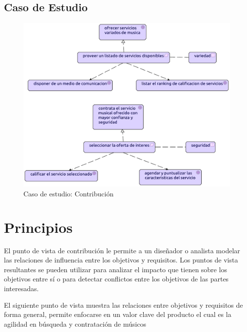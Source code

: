 \subsection{Caso de Estudio}
\begin{figure}[h!]
	\centering
	\includegraphics[width=\linewidth]{Arquitectura/Motivacion/imgs/Contribucion.pdf}
	\caption{Caso de estudio: Contribución}
	\label{fig:comportamiento}
\end{figure}

\newpage


\section{Principios}
El punto de vista de contribución le permite a un diseñador o analista modelar las relaciones de influencia entre los objetivos y requisitos. Los puntos de vista resultantes se pueden utilizar para analizar el impacto que tienen sobre los objetivos entre sí o para detectar conflictos entre los objetivos de las partes interesadas.
 \cite{ArchiMat55:online} \vspace{\baselineskip}

El siguiente punto de vista muestra las relaciones entre objetivos y requisitos de forma general, permite enfocarse en un valor clave del producto el cual es la agilidad en búsqueda y contratación de músicos


